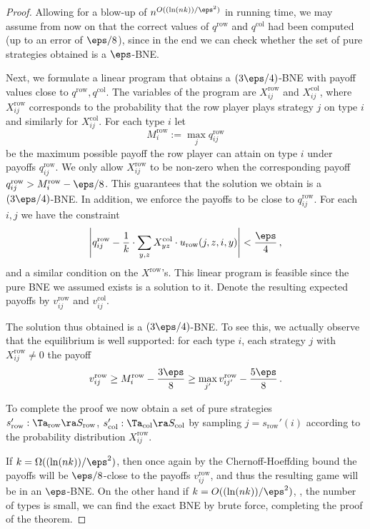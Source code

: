 \begin{proof}
Allowing for a blow-up of $n^{O((\ln (nk))/\eps^2)}$ in running time, we may assume from now on that the correct values 
of $q^{\mathrm{row}}$ and $q^\mathrm{col}$ had been computed (up to an error of $\eps/8$), since in the end we can check whether the set of pure strategies obtained 
is a $\eps$-BNE.

Next, we formulate a linear program that obtains a $(3\eps/4)$-BNE with payoff values close to $q^{\mathrm{row}},q^\mathrm{col}$. The variables 
of the program are $X^{\mathrm{row}}_{ij}$ and $X^\mathrm{col}_{ij}$, where $X^{\mathrm{row}}_{ij}$ corresponds to the probability that the row player plays strategy 
$j$ on type $i$ and similarly for $X^{\mathrm{col}}_{ij}$. For each type $i$ let $$M^{\mathrm{row}}_i := \max_j q^{\mathrm{row}}_{ij}$$ be the maximum possible payoff the row player can attain 
on type $i$ under payoffs $q^{\mathrm{row}}_{ij}$. We only allow $X^{\mathrm{row}}_{ij}$ to be non-zero when the corresponding payoff 
$q^{\mathrm{row}}_{ij}> M^{\mathrm{row}}_i - \eps/8$. This guarantees that the solution we obtain is a $(3\eps/4)$-BNE\@. In addition, we enforce
the payoffs to be close to $q^{\mathrm{row}}_{ij}$. For each $i,j$ we have the constraint
$$
\left| q^{\mathrm{row}}_{ij} - \frac{1}{k}\cdot \sum_{y,z} X^\mathrm{col}_{yz} \cdot u_{\mathrm{row}}(j,z,i,y) \right| < \frac{\eps}{4}\,,
$$ 
and a similar condition on the $X^{\mathrm{row}}$'s. 
This linear program is feasible since the pure BNE we assumed exists is a solution to it. Denote the 
resulting expected payoffs by $v^{\mathrm{row}}_{ij}$ and $v^\mathrm{col}_{ij}$. 

The solution thus obtained is a $(3\eps/4)$-BNE\@. To see this, we actually observe that  the equilibrium is well supported: for each type $i$, 
each strategy $j$ with $X^{\mathrm{row}}_{ij}\neq 0$ the payoff 
\[
v^{\mathrm{row}}_{ij}\ge M_i^{\mathrm{row}}-\frac{3\eps}{8} \ge \max_{j'}
v^{\mathrm{row}}_{ij'}- \frac{5\eps}{8}\,.
\] 

To complete the proof we now obtain a set of pure strategies $s_{\mathrm{row}}':\Ta_{\mathrm{row}}\ra S_{\mathrm{row}}$, $s_\mathrm{col}':\Ta_\mathrm{col}\ra S_\mathrm{col}$ by sampling 
$j=s_{\mathrm{row}}'(i)$ according to the probability distribution $X^{\mathrm{row}}_{ij}$. 

If $k=\Omega((\ln (nk))/\eps^2)$, then once again by the Chernoff-Hoeffding
bound the payoffs will be $\eps/8$-close to the payoffs
$v^{\mathrm{row}}_{ij}$, and thus the resulting game will be in an
$\eps$-BNE\@.  On the other hand if $k=O((\ln (nk))/\eps^2)$, \ie, the
number of types is small, we can find the exact BNE by brute force,
completing the proof of the theorem.
\end{proof}

